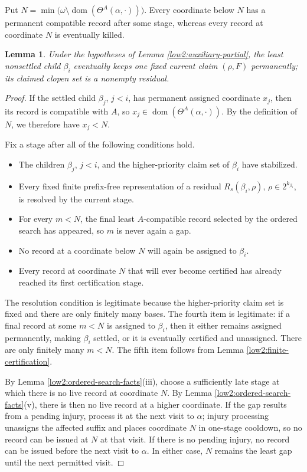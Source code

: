 \documentclass[10pt,a4paper]{amsart}
\newtheorem{lemma}[theorem]{Lemma}
\begin{document}
Put
$N=\min\bigl(\omega\setminus
           \operatorname{dom}(\Theta^A(\alpha,\cdot))\bigr)$.
Every coordinate below $N$ has a permanent compatible record after some
stage, whereas every record at coordinate $N$ is eventually killed.

\begin{lemma}\label{low2:permanent-residual}
Under the hypotheses of Lemma \ref{low2:auxiliary-partial}, the least
nonsettled child $\beta_i$ eventually keeps one fixed current claim
$(\rho,F)$ permanently; its claimed clopen set is a nonempty residual.
\end{lemma}

\begin{proof}
If the settled child $\beta_j$, $j<i$, has permanent assigned coordinate
$x_j$, then its record is compatible with $A$, so
$x_j\in\operatorname{dom}(\Theta^A(\alpha,\cdot))$. By the definition of
$N$, we therefore have $x_j<N$.

Fix a stage after all of the following conditions hold.
\begin{itemize}
\item The children $\beta_j$, $j<i$, and the higher-priority claim set of
      $\beta_i$ have stabilized.
\item Every fixed finite prefix-free representation of a residual
      $R_s(\beta_i,\rho)$, $\rho\in2^{k_{\beta_i}}$, is resolved by the
      current stage.
\item For every $m<N$, the final least $A$-compatible record selected by the
      ordered search has appeared, so $m$ is never again a gap.
\item No record at a coordinate below $N$ will again be assigned to
      $\beta_i$.
\item Every record at coordinate $N$ that will ever become certified has
      already reached its first certification stage.
\end{itemize}
The resolution condition is legitimate because the higher-priority claim
set is fixed and there are only finitely many bases. The fourth item is
legitimate: if a final record at some $m<N$ is assigned to
$\beta_i$, then it either remains assigned permanently, making $\beta_i$
settled, or it is eventually certified and unassigned. There are only
finitely many $m<N$. The fifth item follows from Lemma
\ref{low2:finite-certification}.

By Lemma \ref{low2:ordered-search-facts}(iii), choose a sufficiently late
stage at which there is no live record at coordinate $N$. By Lemma
\ref{low2:ordered-search-facts}(v), there is then no live record at a higher
coordinate. If the gap results from a pending injury, process it at the next
visit to $\alpha$; injury processing unassigns the affected suffix and places
coordinate $N$ in one-stage cooldown, so no record can be issued at $N$ at
that visit. If there is no pending injury, no record can be issued before the
next visit to $\alpha$. In either case, $N$ remains the least gap until the
next permitted visit.


\end{proof}
\end{document}
